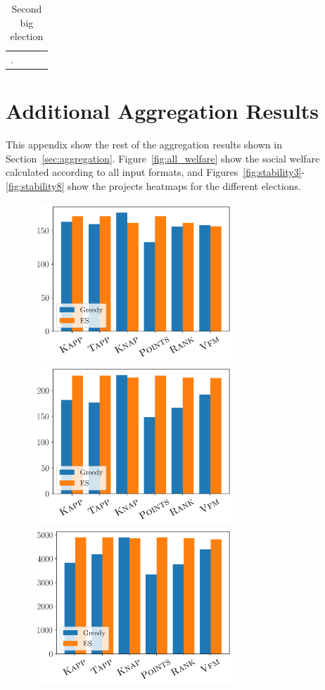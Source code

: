 \documentclass[10pt]{article}
\begin{document}
\begin{appendices}
\begin{longtable}[ht!]{|p{4cm}|p{8cm}|p{3cm}|c|}
     \hline
  \caption{Second big election}\label{tab:fourth_elc}.
\end{longtable}

\section{Additional Aggregation Results}\label{app:aggregation}
This appendix show the rest of the aggregation results shown in Section~\ref{sec:aggregation}. Figure~\ref{fig:all_welfare} show the social welfare calculated according to all input formats, and Figures~\ref{fig:stability3}-\ref{fig:stability8} show the projects heatmaps for the different elections.

\begin{figure}[!htbp]
\begin{center}
\includegraphics[width=7.5cm]{experiment/k_approval_welfare.png}
\includegraphics[width=7.5cm]{experiment/Knapsack_welfare.png}
\includegraphics[width=7.5cm]{experiment/Ranking_value_welfare.png}

\end{center}
\end{figure}
\end{appendices}
\end{document}
